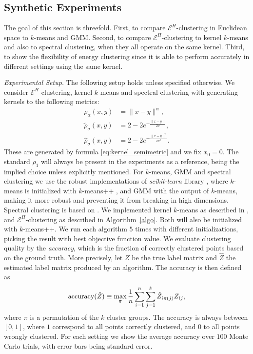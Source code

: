 \documentclass{article}
\begin{document}
\subsection{Synthetic Experiments}

The goal of this section is threefold. First, to compare
$\mathcal{E}^H$-clustering in Euclidean space 
to $k$-means and GMM. 
Second, to compare $\mathcal{E}^H$-clustering  to
kernel $k$-means and also to spectral clustering, when they all operate
on the same kernel.
Third, to show the flexibility
of energy clustering since it is able to perform 
accurately in different settings using the same kernel.

\emph{Experimental Setup.} 
The following setup holds unless specified
otherwise. 
We consider
$\mathcal{E}^H$-clustering, kernel $k$-means and spectral clustering
with \mbox{generating} kernels to the following metrics:
\begin{subequations}
\label{eq:test_metrics}
\begin{align}
\rho_{\alpha}(x,y) &= \| x-y \|^{\alpha}, \\
\widetilde{\rho}_{\sigma}(x,y) &= 2 - 2 e^{-\tfrac{\|x-y\|}{2 \sigma}},  \\
\widehat{\rho}_{\sigma}(x,y) &= 2 - 2 e^{-\tfrac{\|x-y\|^2}{2 \sigma^2}}.  
\end{align}
\end{subequations}
These are generated by formula \eqref{eq:kernel_semimetric}
and we fix $x_0=0$.
The standard $\rho_1$ will always be present in the experiments 
as a reference, being the implied choice unless explicitly mentioned.
For $k$-means, GMM and spectral clustering we use the robust 
implementations of \emph{scikit-learn} library \citep{scikit-learn}, where  
$k$-means is initialized with 
$k$-means++ \citep{Vassilvitskii}, 
and GMM with the output of $k$-means, making it more robust and preventing
it from breaking in high dimensions. 
Spectral clustering is based on \citet{Malik}. 
We implemented kernel $k$-means
as described in \citet{Dhillon2,Dhillon}, and $\mathcal{E}^H$-clustering
as described in Algorithm~\ref{algo}. Both
will also be initialized with $k$-means++.
We run each algorithm $5$ times with different initializations, picking
the result with best objective function value. 
We evaluate clustering quality by
the \emph{accuracy}, which is the fraction of correctly clustered points
based on the ground truth. More precisely, let $Z$ be the true label
matrix and $\hat{Z}$ the estimated label matrix produced by 
an algorithm. The accuracy is then defined as
\begin{equation}
\label{eq:accuracy}
\textnormal{accuracy}(\hat{Z}) \equiv \max_\pi \dfrac{1}{n} \sum_{i=1}^n
\sum_{j=1}^k \hat{Z}_{i \pi(j)} Z_{ij},
\end{equation}
where $\pi$ is a permutation of the $k$ cluster groups. The accuracy
is always between $[0,1]$, where $1$ correspond to all points correctly
clustered, and $0$ to all points wrongly clustered.
For each setting we show 
the average accuracy over $100$ Monte
Carlo trials, with error bars being standard error.
\end{document}

